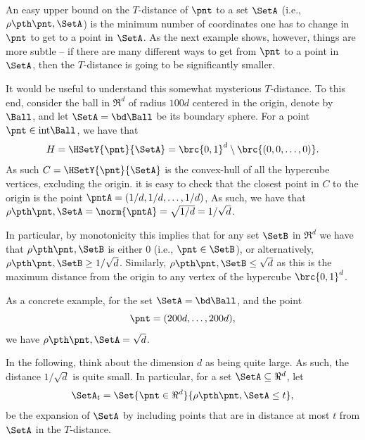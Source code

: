 \begin{observation}
    An easy upper bound on the $T$-distance of $\pnt$ to a set $\SetA$
    (i.e., $\distTY{\pnt}{\SetA}$) is the minimum number of
    coordinates one has to change in $\pnt$ to get to a point in
    $\SetA$. As the next example shows, however, things are more
    subtle -- if there are many different ways to get from $\pnt$ to a
    point in $\SetA$, then the $T$-distance is going to be
    significantly smaller.
\end{observation}


\begin{example}
    It would be useful to understand this somewhat mysterious
    $T$-distance. To this end, consider the ball in $\Re^d$ of radius
    $100d$ centered in the origin, denote by $\Ball $, and let
    $\SetA =\bd \Ball$ be its boundary sphere. For a point
    $\pnt \in \mathrm{int} \Ball$, we have that
    \begin{equation*}
        H = \HSetY{\pnt}{\SetA} = \brc{0,1}^d \setminus \brc{(0,0, \ldots,
           0)}.
    \end{equation*}
    As such $C= \HSetY{\pnt}{\SetA}$ is the convex-hull of all the
    hypercube vertices, excluding the origin. it is easy to check that
    the closest point in $C$ to the origin is the point
    $\pntA = (1/d, 1/d, \ldots, 1/d)$, As such, we have that
    $\distTY{\pnt}{\SetA} = \norm{\pntA} = \sqrt{1/d} = 1/\sqrt{d}$.

    In particular, by monotonicity this implies that for any set
    $\SetB$ in $\Re^d$ we have that $\distTY{\pnt}{\SetB}$ is either
    $0$ (i.e., $\pnt \in \SetB$), or alternatively,
    $\distTY{\pnt}{\SetB} \geq 1/\sqrt{d}$. Similarly,
    $\distTY{\pnt}{\SetB} \leq \sqrt{d}$ as this is the maximum
    distance from the origin to any vertex of the hypercube
    $\brc{0,1}^d$.

    As a concrete example, for the set $\SetA = \bd \Ball$, and the
    point 
    \begin{equation*}
        \pnt = (200d,\ldots, 200d),
    \end{equation*}
     we have
    $\distTY{\pnt}{\SetA} = \sqrt{d}$.
\end{example}


In the following, think about the dimension $d$ as being quite
large. As such, the distance $1/\sqrt{d}$ is quite small. In
particular, for a set $\SetA \subseteq \Re^d$, let
\begin{equation*}
    \SetA_t = \Set{ \pnt \in \Re^d}{\distTY{\pnt}{\SetA} \leq t},
\end{equation*}
be the expansion of $\SetA$ by including points that are in distance
at most $t$ from $\SetA$ in the $T$-distance.


